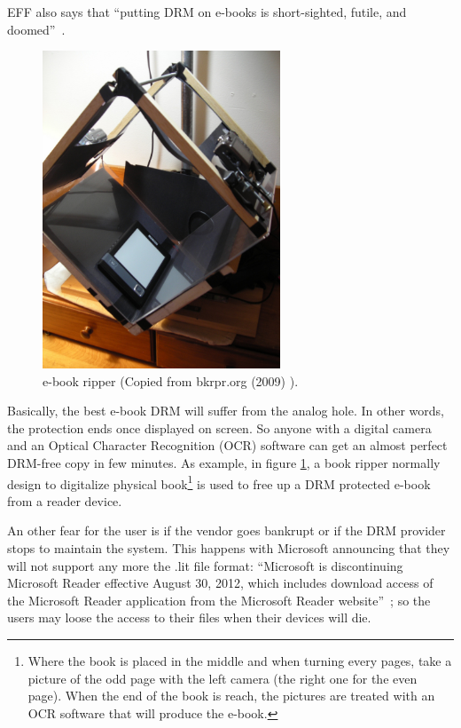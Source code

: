 \documentclass[11pt,a4paper,oneside]{memoir}
\begin{document}
EFF also says that \textquotedblleft putting DRM on e-books is short-sighted, futile, and doomed\textquotedblright ~\cite{eff:e-book_drm_fail}. 
\begin{figure}[h]
   \centering
   	\includegraphics[width=7.1cm]{flickr_e-book-ripper}
   \caption{e-book ripper (Copied from bkrpr.org (2009) \cite{flickr:e-book_ripper}).}
   \label{fig:def:e-book_ripper}
\end{figure}
Basically, the best e-book DRM will suffer from the analog hole. In other words, the protection ends once displayed on screen. So anyone with a digital camera and an Optical Character Recognition (OCR) software can get an almost perfect DRM-free copy in few minutes. As example, in figure \ref{fig:def:e-book_ripper}, a book ripper normally design to digitalize physical book\footnote{Where the book is placed in the middle and when turning every pages, take a picture of the odd page with the left camera (the right one for the even page). When the end of the book is reach, the pictures are treated with an OCR software that will produce the e-book.} is used to free up a DRM protected e-book from a reader device. 

An other fear for the user is if the vendor goes bankrupt or if the DRM provider stops to maintain the system. This happens with Microsoft\label{def:opp_ms} announcing that they will not support any more the .lit file format: \textquotedblleft Microsoft is discontinuing Microsoft Reader effective August 30, 2012, which includes download access of the Microsoft Reader application from the Microsoft Reader website\textquotedblright ~\cite{microsoft:reader}; so the users may loose the access to their files when their devices will die.
\end{document}
